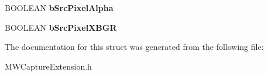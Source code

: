 \begin{DoxyCompactItemize}
\item 
\hypertarget{struct__MWCAP__VIDEO__UPLOAD__IMAGE_a689e22c491841754d3d49edb30ce0763}{B\-O\-O\-L\-E\-A\-N {\bfseries b\-Src\-Pixel\-Alpha}}\label{struct__MWCAP__VIDEO__UPLOAD__IMAGE_a689e22c491841754d3d49edb30ce0763}

\item 
\hypertarget{struct__MWCAP__VIDEO__UPLOAD__IMAGE_a30cab4a23b1133d33fc41820209a0568}{B\-O\-O\-L\-E\-A\-N {\bfseries b\-Src\-Pixel\-X\-B\-G\-R}}\label{struct__MWCAP__VIDEO__UPLOAD__IMAGE_a30cab4a23b1133d33fc41820209a0568}

\end{DoxyCompactItemize}


The documentation for this struct was generated from the following file\-:\begin{DoxyCompactItemize}
\item 
M\-W\-Capture\-Extension.\-h\end{DoxyCompactItemize}
